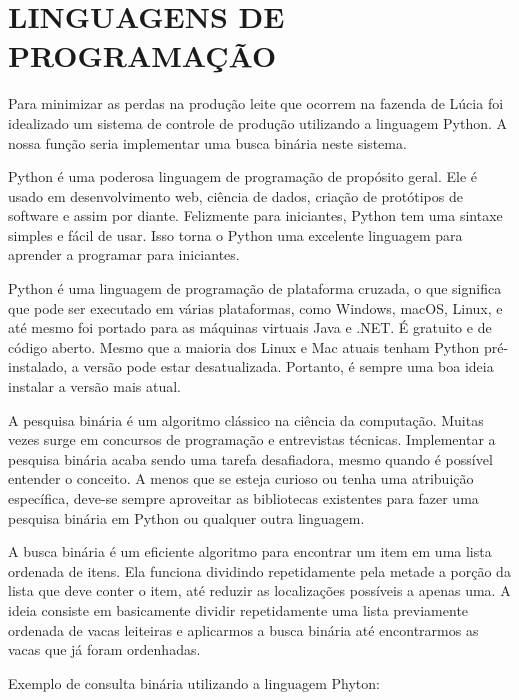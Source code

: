 \section{LINGUAGENS DE PROGRAMAÇÃO}

Para minimizar as perdas na produção leite que ocorrem na fazenda de Lúcia foi idealizado um sistema de controle de produção utilizando a linguagem Python. A nossa função seria implementar uma busca binária neste sistema.

Python é uma poderosa linguagem de programação de propósito geral. Ele é usado em desenvolvimento web, ciência de dados, criação de protótipos de software e assim por diante. Felizmente para iniciantes, Python tem uma sintaxe simples e fácil de usar. Isso torna o Python uma excelente linguagem para aprender a programar para iniciantes.

Python é uma linguagem de programação de plataforma cruzada, o que significa que pode ser executado em várias plataformas, como Windows, macOS, Linux, e até mesmo foi portado para as máquinas virtuais Java e .NET. É gratuito e de código aberto.
Mesmo que a maioria dos Linux e Mac atuais tenham Python pré-instalado, a versão pode estar desatualizada. Portanto, é sempre uma boa ideia instalar a versão mais atual.

A pesquisa binária é um algoritmo clássico na ciência da computação. Muitas vezes surge em concursos de programação e entrevistas técnicas. Implementar a pesquisa binária acaba sendo uma tarefa desafiadora, mesmo quando é possível entender o conceito. A menos que se esteja curioso ou tenha uma atribuição específica, deve-se sempre aproveitar as bibliotecas existentes para fazer uma pesquisa binária em Python ou qualquer outra linguagem.

A busca binária é um eficiente algoritmo para encontrar um item em uma lista ordenada de itens. Ela funciona dividindo repetidamente pela metade a porção da lista que deve conter o item, até reduzir as localizações possíveis a apenas uma. 
A ideia consiste em basicamente dividir repetidamente uma lista previamente ordenada de vacas leiteiras e aplicarmos a busca binária até encontrarmos as vacas que já foram ordenhadas.   

Exemplo de consulta binária utilizando a linguagem Phyton:


